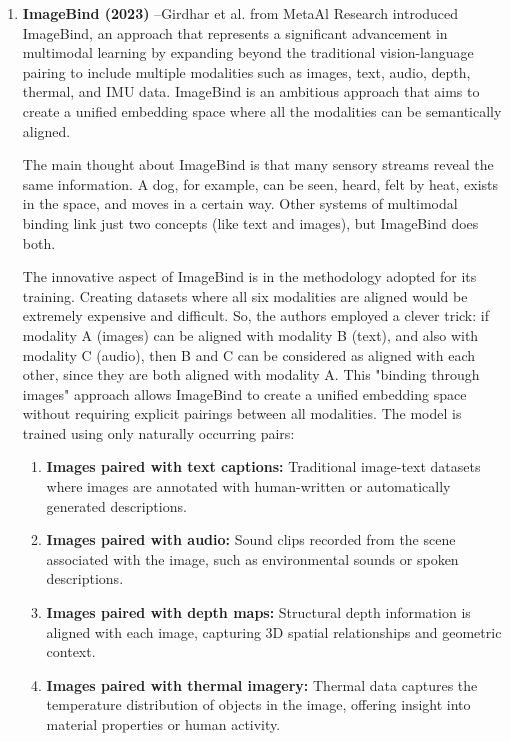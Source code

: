 \documentclass[conference]{IEEEtran}
\begin{document}
\begin{enumerate}
\item \textbf{ImageBind (2023)} –Girdhar et al. \cite{girdhar2023imagebind}  from MetaAl Research introduced ImageBind, an approach that represents a significant advancement in multimodal learning by expanding beyond the traditional vision-language pairing to include multiple modalities such as images, text, audio, depth, thermal, and IMU data. ImageBind is an ambitious approach that aims to create a unified embedding space where all the modalities can be semantically aligned.


The main thought about ImageBind is that many sensory streams reveal the same information. A dog, for example, can be seen, heard, felt by heat, exists in the space, and moves in a certain way. Other systems of multimodal binding link just two concepts (like text and images), but ImageBind does both.

The innovative aspect of ImageBind is in the methodology adopted for its training. Creating datasets where all six modalities are aligned would be extremely expensive and difficult. So, the authors employed a clever trick: if modality A (images) can be aligned with modality B (text), and also with modality C (audio), then B and C can be considered as aligned with each other, since they are both aligned with modality A.
This "binding through images" approach allows ImageBind to create a unified embedding space without requiring explicit pairings between all modalities. The model is trained using only naturally occurring pairs:

\begin{enumerate}
    \item \textbf{Images paired with text captions:} Traditional image-text datasets where images are annotated with human-written or automatically generated descriptions.
    
    \item \textbf{Images paired with audio:} Sound clips recorded from the scene associated with the image, such as environmental sounds or spoken descriptions.
    
    \item \textbf{Images paired with depth maps:} Structural depth information is aligned with each image, capturing 3D spatial relationships and geometric context.
    
    \item \textbf{Images paired with thermal imagery:} Thermal data captures the temperature distribution of objects in the image, offering insight into material properties or human activity.
    

\end{enumerate}
\end{enumerate}
\end{document}
